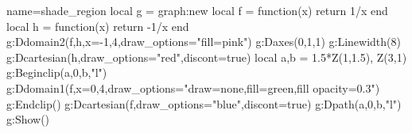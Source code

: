 \documentclass{standalone}%
\begin{document}
\begin{luadraw}{name=shade_region}
local g = graph:new{}
local f = function(x) return 1/x end
local h = function(x) return -1/x end
g:Ddomain2(f,h,{x={-1,4},draw_options="fill=pink"})
g:Daxes({0,1,1})
g:Linewidth(8)
g:Dcartesian(h,{draw_options="red",discont=true})
local a,b = 1.5*Z(1,1.5), Z(3,1)
g:Beginclip({a,0,b,"l"})
g:Ddomain1(f,{x={0,4},draw_options="draw=none,fill=green,fill opacity=0.3"})
g:Endclip()
g:Dcartesian(f,{draw_options="blue",discont=true})
g:Dpath({a,0,b,"l"})
g:Show()
\end{luadraw}
\end{document}
